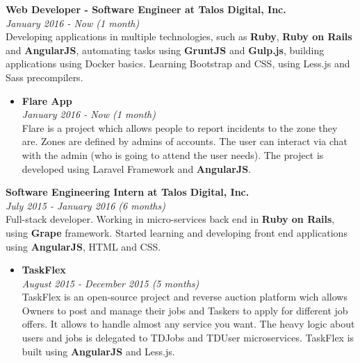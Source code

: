 \documentclass[margin, 10pt]{res} %
\begin{document}
\begin{resume}
\textbf{Web Developer - Software Engineer at Talos Digital, Inc.} \\
\textit{January 2016 - Now (1 month)} \\
Developing applications in multiple technologies, such as \textbf{Ruby}, \textbf{Ruby on Rails} and
\textbf{AngularJS}, automating tasks using \textbf{GruntJS} and \textbf{Gulp.js}, building
applications using Docker basics. Learning Bootstrap and CSS, using Less.js and Sass precompilers.
\begin{itemize}
  \item \textbf{Flare App} \\
        \textit{January 2016 - Now (1 month)} \\
        Flare is a project which allows people to report incidents to the zone they are. Zones are
        defined by admins of accounts. The user can interact via chat with the admin (who is going
        to attend the user needs). The project is developed using Laravel Framework and
        \textbf{AngularJS}. \\
\end{itemize}

\textbf{Software Engineering Intern at Talos Digital, Inc.} \\
\textit{July 2015 - January 2016 (6 months)} \\
Full-stack developer. Working in micro-services back end in \textbf{Ruby on Rails}, using
\textbf{Grape} framework. Started learning and developing front end applications using
\textbf{AngularJS}, HTML and CSS.

\begin{itemize}
  \item \textbf{TaskFlex} \\
        \textit{August 2015 - December 2015 (5 months)} \\
        TaskFlex is an open-source project and reverse auction platform wich allows Owners to post
        and manage their jobs and Taskers to apply for different job offers. It allows to handle
        almost any service you want. The heavy logic about users and jobs is delegated to TDJobs and
        TDUser microservices. TaskFlex is built using \textbf{AngularJS} and Less.js. \\


\end{itemize}
\end{resume}
\end{document}
